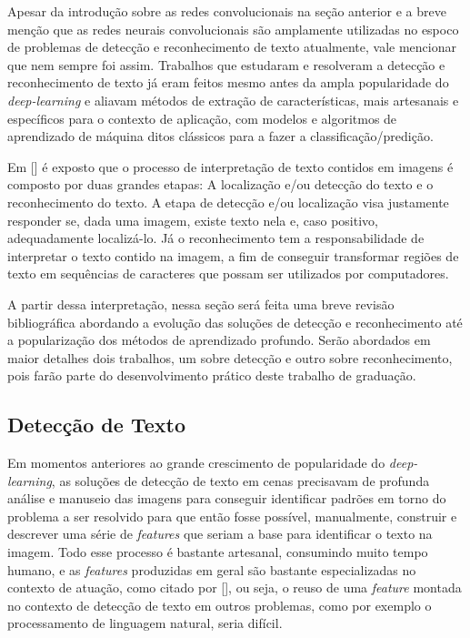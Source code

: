 Apesar da introdução sobre as redes convolucionais na seção anterior e a breve menção que as redes neurais convolucionais são amplamente utilizadas no espoco de problemas de detecção e reconhecimento de texto atualmente, vale mencionar que nem sempre foi assim. Trabalhos que estudaram e resolveram a detecção e reconhecimento de texto já eram feitos mesmo antes da ampla popularidade do \textit{deep-learning} e aliavam métodos de extração de características, mais artesanais e específicos para o contexto de aplicação, com modelos e algoritmos de aprendizado de máquina ditos clássicos para a fazer a classificação/predição.

Em [] é exposto que o processo de interpretação de texto contidos em imagens é composto por duas grandes etapas: A localização e/ou detecção do texto e o reconhecimento do texto. A etapa de detecção e/ou localização visa justamente responder se, dada uma imagem, existe texto nela e, caso positivo, adequadamente localizá-lo. Já o reconhecimento tem a responsabilidade de interpretar o texto contido na imagem, a fim de conseguir transformar regiões de texto em sequências de caracteres que possam ser utilizados por computadores.

A partir dessa interpretação, nessa seção será feita uma breve revisão bibliográfica abordando a evolução das soluções de detecção e reconhecimento até a popularização dos métodos de aprendizado profundo. Serão abordados em maior detalhes dois trabalhos, um sobre detecção e outro sobre reconhecimento, pois farão parte do desenvolvimento prático deste trabalho de graduação.


\subsection{Detecção de Texto}
Em momentos anteriores ao grande crescimento de popularidade do \textit{deep-learning}, as soluções de detecção de texto em cenas precisavam de profunda análise e manuseio das imagens para conseguir identificar padrões em torno do problema a ser resolvido para que então fosse possível, manualmente, construir e descrever uma série de \textit{features} que seriam a base para identificar o texto na imagem. Todo esse processo é bastante artesanal, consumindo muito tempo humano, e as \textit{features} produzidas em geral são bastante especializadas no contexto de atuação, como citado por [], ou seja, o reuso de uma \textit{feature} montada no contexto de detecção de texto em outros problemas, como por exemplo o processamento de linguagem natural, seria difícil.

